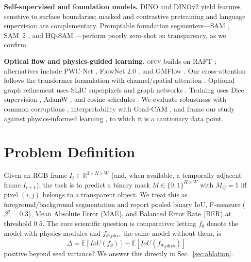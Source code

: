 \documentclass[conference]{IEEEtran}
\newcommand{\ofcv}{\textsc{ofcv}}
\newcommand{\dinov}{DINOv2}
\newcommand{\iou}{IoU}
\begin{document}
\textbf{Self-supervised and foundation models.} DINO \cite{caron2021dino} and
\dinov{} \cite{oquab2023dinov2} yield features sensitive to surface boundaries;
masked \cite{he2022mae} and contrastive \cite{he2020moco} pretraining and
language supervision \cite{radford2021clip} are complementary. Promptable
foundation segmenters---SAM \cite{kirillov2023sam}, SAM~2
\cite{ravi2024sam2}, and HQ-SAM \cite{ke2023hqsam}---perform poorly zero-shot on
transparency, as we confirm.

\textbf{Optical flow and physics-guided learning.} \ofcv{} builds on RAFT
\cite{teed2020raft}; alternatives include PWC-Net \cite{sun2018pwcnet}, FlowNet
2.0 \cite{ilg2017flownet2}, and GMFlow \cite{xu2022gmflow}. Our cross-attention
follows the transformer formulation \cite{vaswani2017transformer} with
channel/spatial attention \cite{woo2018cbam,hu2018senet}. Optional graph
refinement uses SLIC superpixels \cite{achanta2012slic} and graph networks
\cite{kipf2017gcn,xu2019gin}. Training uses Dice supervision
\cite{milletari2016vnet}, AdamW \cite{loshchilov2019adamw}, and cosine schedules
\cite{loshchilov2017sgdr}. We evaluate robustness with common corruptions
\cite{hendrycks2019robustness}, interpretability with Grad-CAM
\cite{selvaraju2017gradcam}, and frame our study against physics-informed
learning \cite{karniadakis2021piml}, to which it is a cautionary data point.

\section{Problem Definition}
Given an RGB frame $I_t\in\mathbb{R}^{3\times H\times W}$ (and, when available, a
temporally adjacent frame $I_{t+1}$), the task is to predict a binary mask
$M\in\{0,1\}^{H\times W}$ with $M_{ij}=1$ iff pixel $(i,j)$ belongs to a
transparent object. We treat this as foreground/background segmentation and
report pooled binary \iou, F-measure ($\beta^2=0.3$), Mean Absolute Error
(MAE), and Balanced Error Rate (BER) at threshold $0.5$. The core scientific
question is comparative: letting $f_\theta$ denote the model with physics
modules and $f_{\theta\setminus\mathrm{phys}}$ the same model without them, is
\begin{equation}
\Delta = \mathbb{E}\!\left[\iou(f_\theta)\right]-\mathbb{E}\!\left[\iou(f_{\theta\setminus\mathrm{phys}})\right]
\end{equation}
positive beyond seed variance? We answer this directly in Sec.~\ref{sec:ablation}.
\end{document}
